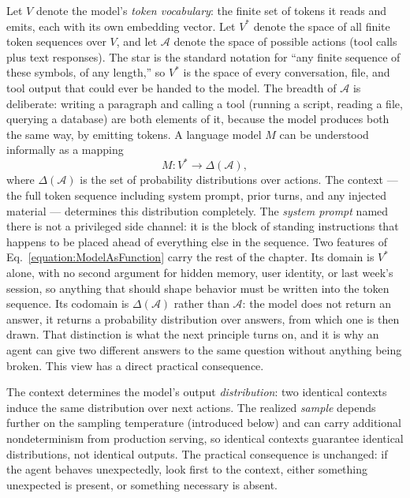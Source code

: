 Let $V$ denote the model's \emph{token vocabulary}: the finite set of tokens it reads and emits, each with its own embedding vector.
Let $V^*$ denote the space of all finite token sequences over $V$, and let $\mathcal{A}$ denote the space of possible actions (tool calls plus text responses).
The star is the standard notation for ``any finite sequence of these symbols, of any length,'' so $V^*$ is the space of every conversation, file, and tool output that could ever be handed to the model.
The breadth of $\mathcal{A}$ is deliberate: writing a paragraph and calling a tool (running a script, reading a file, querying a database) are both elements of it, because the model produces both the same way, by emitting tokens.
A language model $M$ can be understood informally as a mapping
\begin{equation}
M : V^* \to \Delta(\mathcal{A}) ,
\label{equation:ModelAsFunction}
\end{equation}
where $\Delta(\mathcal{A})$ is the set of probability distributions over actions.
The context — the full token sequence including system prompt, prior turns, and any injected material — determines this distribution completely.
The \emph{system prompt} named there is not a privileged side channel: it is the block of standing instructions that happens to be placed ahead of everything else in the sequence.
Two features of Eq.~\eqref{equation:ModelAsFunction} carry the rest of the chapter.
Its domain is $V^*$ alone, with no second argument for hidden memory, user identity, or last week's session, so anything that should shape behavior must be written into the token sequence.
Its codomain is $\Delta(\mathcal{A})$ rather than $\mathcal{A}$: the model does not return an answer, it returns a probability distribution over answers, from which one is then drawn.
That distinction is what the next principle turns on, and it is why an agent can give two different answers to the same question without anything being broken.
This view has a direct practical consequence.

\begin{principle}
\label{principle:ContextDeterminesOutput}
The context determines the model's output \emph{distribution}: two identical contexts induce the same distribution over next actions.
The realized \emph{sample} depends further on the sampling temperature (introduced below) and can carry additional nondeterminism from production serving, so identical contexts guarantee identical distributions, not identical outputs.
The practical consequence is unchanged: if the agent behaves unexpectedly, look first to the context, either something unexpected is present, or something necessary is absent.
\end{principle}

